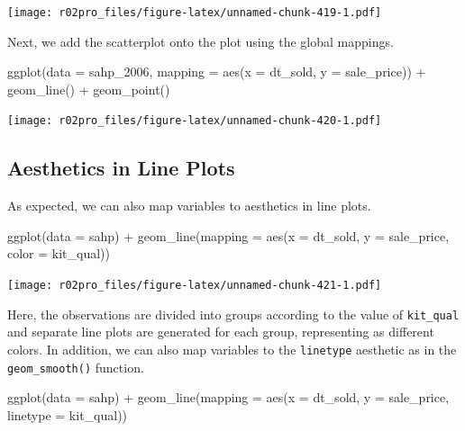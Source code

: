 \documentclass[
]{book}
\newenvironment{Shaded}{\begin{snugshade}}{\end{snugshade}}
\newcommand{\AttributeTok}[1]{\textcolor[rgb]{0.77,0.63,0.00}{#1}}
\newcommand{\FunctionTok}[1]{\textcolor[rgb]{0.00,0.00,0.00}{#1}}
\newcommand{\NormalTok}[1]{#1}
\newcommand{\SpecialCharTok}[1]{\textcolor[rgb]{0.00,0.00,0.00}{#1}}
\begin{document}
\texttt{[image: r02pro\_files/figure-latex/unnamed-chunk-419-1.pdf]}

Next, we add the scatterplot onto the plot using the global mappings.

\begin{Shaded}
\begin{Highlighting}[]
\FunctionTok{ggplot}\NormalTok{(}\AttributeTok{data =}\NormalTok{ sahp\_2006, }\AttributeTok{mapping =} \FunctionTok{aes}\NormalTok{(}\AttributeTok{x =}\NormalTok{ dt\_sold, }\AttributeTok{y =}\NormalTok{ sale\_price)) }\SpecialCharTok{+} \FunctionTok{geom\_line}\NormalTok{() }\SpecialCharTok{+} \FunctionTok{geom\_point}\NormalTok{()}
\end{Highlighting}
\end{Shaded}

\texttt{[image: r02pro\_files/figure-latex/unnamed-chunk-420-1.pdf]}

\hypertarget{aesthetics-in-line-plots}{%
\subsection{Aesthetics in Line Plots}\label{aesthetics-in-line-plots}}

As expected, we can also map variables to aesthetics in line plots.

\begin{Shaded}
\begin{Highlighting}[]
\FunctionTok{ggplot}\NormalTok{(}\AttributeTok{data =}\NormalTok{ sahp) }\SpecialCharTok{+} \FunctionTok{geom\_line}\NormalTok{(}\AttributeTok{mapping =} \FunctionTok{aes}\NormalTok{(}\AttributeTok{x =}\NormalTok{ dt\_sold, }\AttributeTok{y =}\NormalTok{ sale\_price, }\AttributeTok{color =}\NormalTok{ kit\_qual))}
\end{Highlighting}
\end{Shaded}

\texttt{[image: r02pro\_files/figure-latex/unnamed-chunk-421-1.pdf]}

Here, the observations are divided into groups according to the value of \texttt{kit\_qual} and separate line plots are generated for each group, representing as different colors. In addition, we can also map variables to the \texttt{linetype} aesthetic as in the \texttt{geom\_smooth()} function.

\begin{Shaded}
\begin{Highlighting}[]
\FunctionTok{ggplot}\NormalTok{(}\AttributeTok{data =}\NormalTok{ sahp) }\SpecialCharTok{+} \FunctionTok{geom\_line}\NormalTok{(}\AttributeTok{mapping =} \FunctionTok{aes}\NormalTok{(}\AttributeTok{x =}\NormalTok{ dt\_sold, }\AttributeTok{y =}\NormalTok{ sale\_price, }\AttributeTok{linetype =}\NormalTok{ kit\_qual))}
\end{Highlighting}
\end{Shaded}
\end{document}
